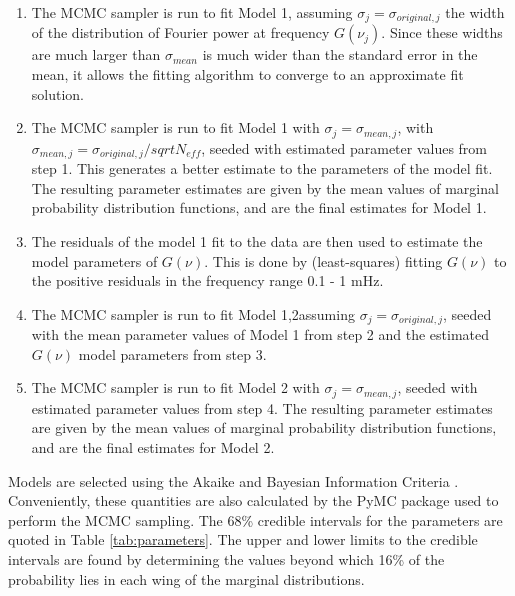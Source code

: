 \documentclass{aastex}
\begin{document}
\begin{enumerate}
\item The MCMC sampler is run to fit Model 1, assuming $\sigma_{j} =
  \sigma_{original, j}$ the width of the distribution of Fourier power
  at frequency $G(\nu_{j})$.  Since these widths are much larger than
  $\sigma_{mean}$ is much wider than the standard error in the mean,
  it allows the fitting algorithm to converge to an approximate fit
  solution.
\item The MCMC sampler is run to fit Model 1 with $\sigma_{j} =
  \sigma_{mean, j}$, with $\sigma_{mean, j}= \sigma_{original,
    j}/sqrt{N_{eff}}$, seeded with estimated parameter values from
  step 1.  This generates a better estimate to the parameters of the
  model fit.  The resulting parameter estimates are given by the mean
  values of marginal probability distribution functions, and are the
  final estimates for Model 1.
\item The residuals of the model 1 fit to the data are then used to
  estimate the model parameters of $G(\nu)$.  This is done by
  (least-squares) fitting $G(\nu)$ to the positive residuals in the
  frequency range 0.1 - 1 mHz.
\item The MCMC sampler is run to fit Model 1,2assuming $\sigma_{j} =
  \sigma_{original, j}$, seeded with the mean parameter values of
  Model 1 from step 2 and the estimated $G(\nu)$ model parameters from
  step 3.
\item The MCMC sampler is run to fit Model 2 with $\sigma_{j} =
  \sigma_{mean, j}$, seeded with estimated parameter values from step
  4.  The resulting parameter estimates are given by the mean values
  of marginal probability distribution functions, and are the final
  estimates for Model 2.
\end{enumerate}
Models are selected using the Akaike and Bayesian Information Criteria
\citep{2007MNRAS.377L..74L}.  Conveniently, these quantities are also
calculated by the PyMC package used to perform the MCMC sampling.  The
68\% credible intervals for the parameters are quoted in Table
\ref{tab:parameters}.  The upper and lower limits to the credible
intervals are found by determining the values beyond which 16\% of the
probability lies in each wing of the marginal distributions.

\end{document}
